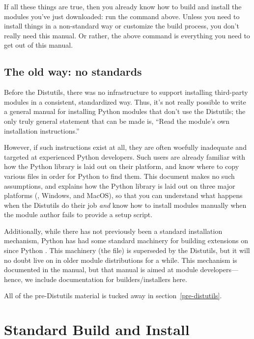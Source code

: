 \documentclass{howto}
\begin{document}
If all these things are true, then you already know how to build and
install the modules you've just downloaded: run the command above.
Unless you need to install things in a non-standard way or customize the
build process, you don't really need this manual.  Or rather, the above
command is everything you need to get out of this manual.


\subsection{The old way: no standards}
\label{old-way}

Before the Distutils, there was no infrastructure to support installing
third-party modules in a consistent, standardized way.  Thus, it's not
really possible to write a general manual for installing Python modules
that don't use the Distutils; the only truly general statement that can
be made is, ``Read the module's own installation instructions.''

However, if such instructions exist at all, they are often woefully
inadequate and targeted at experienced Python developers.  Such users
are already familiar with how the Python library is laid out on their
platform, and know where to copy various files in order for Python to
find them.  This document makes no such assumptions, and explains how
the Python library is laid out on three major platforms (\UNIX, Windows,
and MacOS), so that you can understand what happens when the Distutils
do their job \emph{and} know how to install modules manually when the
module author fails to provide a setup script.

Additionally, while there has not previously been a standard
installation mechanism, Python has had some standard machinery for
building extensions on \UNIX{} since Python .  This
machinery (the  file) is superseded by the
Distutils, but it will no doubt live on in older module distributions
for a while.  This  mechanism is documented in
the  manual,
but that manual is aimed at module developers---hence, we include
documentation for builders/installers here.

All of the pre-Distutils material is tucked away in
section~\ref{pre-distutils}.


\section{Standard Build and Install}
\label{standard-install}
\end{document}
